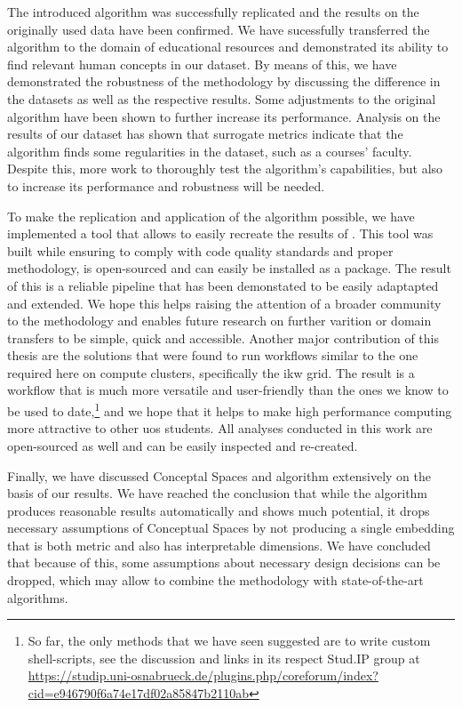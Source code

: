 The introduced algorithm was successfully replicated and the results on the originally used data have been confirmed. We have sucessfully transferred the algorithm to the domain of educational resources and demonstrated its ability to find relevant human concepts in our dataset. By means of this, we have demonstrated the robustness of the methodology by discussing the difference in the datasets as well as the respective results. Some adjustments to the original algorithm have been shown to further increase its performance. Analysis on the results of our dataset has shown that surrogate metrics indicate that the algorithm finds some regularities in the dataset, such as a courses' faculty. Despite this, more work to thoroughly test the algorithm's capabilities, but also to increase its performance and robustness will be needed.

To make the replication and application of the algorithm possible, we have implemented a tool that allows to easily recreate the results of \mainalgos. This tool was built while ensuring to comply with code quality standards and proper methodology, is open-sourced and can easily be installed as a package. The result of this is a reliable pipeline that has been demonstated to be easily adaptapted and extended. We hope this helps raising the attention of a broader community to the methodology and enables future research on further varition or domain transfers to be simple, quick and accessible. Another major contribution of this thesis are the solutions that were found to run workflows similar to the one required here on compute clusters, specifically the \gls{ikw} grid. The result is a workflow that is much more versatile and user-friendly than the ones we know to be used to date,\footnote{So far, the only methods that we have seen suggested are to write custom shell-scripts, see \eg the discussion and links in its respect Stud.IP group at \url{https://studip.uni-osnabrueck.de/plugins.php/coreforum/index?cid=e946790f6a74e17df02a85847b2110ab} } and we hope that it helps to make high performance computing more attractive to other \gls{uos} students. All analyses conducted in this work are open-sourced as well and can be easily inspected and re-created.

Finally, we have discussed Conceptal Spaces and  algorithm extensively on the basis of our results. We have reached the conclusion that while the algorithm produces reasonable results automatically and shows much potential, it drops necessary assumptions of Conceptual Spaces by not producing a single embedding that is both metric and also has interpretable dimensions. We have concluded that because of this, some assumptions about necessary design decisions can be dropped, which may allow to combine the methodology with state-of-the-art algorithms.


